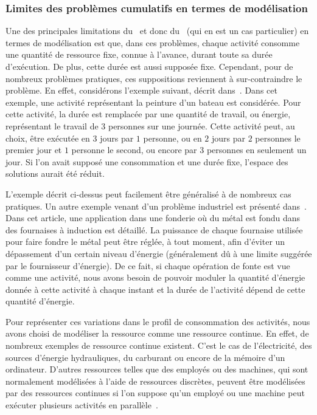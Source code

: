 \subsubsection{Limites des problèmes cumulatifs en termes de modélisation}
\label{sec:limit_CUSP}
Une des principales limitations du \RCPSP~et donc du \CUSP~(qui en est
un cas particulier) en termes de modélisation est que, dans ces
problèmes, chaque activité consomme une quantité de ressource fixe,
connue à l'avance, durant toute sa durée d'exécution. De plus, cette
durée est aussi supposée fixe. Cependant, pour de nombreux problèmes
pratiques, ces suppositions reviennent à sur-contraindre le
problème. En effet, considérons l'exemple suivant, décrit
dans~\cite{FT}.  Dans cet exemple, une activité représentant la
peinture d'un bateau est considérée. Pour cette activité, la durée est
remplacée par une quantité de travail, ou énergie, représentant le
travail de $3$ personnes sur une journée. Cette activité peut, au
choix, être exécutée en $3$ jours par $1$ personne, ou en $2$ jours
par $2$ personnes le premier jour et $1$ personne le second, ou encore
par $3$ personnes en seulement un jour. Si l'on avait supposé une
consommation et une durée fixe, l'espace des solutions aurait été
réduit.

L'exemple décrit ci-dessus peut facilement être généralisé à de
nombreux cas pratiques. Un autre exemple venant d'un problème
industriel est présenté dans~\cite{HaitArtiguesLopez}. Dans cet
article, une application dans une fonderie où du métal est fondu dans
des fournaises à induction est détaillé. La puissance de chaque
fournaise utilisée pour faire fondre le métal peut être réglée, à tout
moment, afin d'éviter un dépassement d'un certain niveau d'énergie
(généralement dû à une limite suggérée par le fournisseur
d'énergie). De ce fait, si chaque opération de fonte est vue comme une
activité, nous avons besoin de pouvoir moduler la quantité d'énergie
donnée à cette activité à chaque instant et la durée de l'activité
dépend de cette quantité d'énergie.

Pour représenter ces variations dans le profil de consommation des
activités, nous avons choisi de modéliser la ressource comme une
ressource continue. En effet, de nombreux exemples de ressource
continue existent. C'est le cas de l'électricité, des sources
d'énergie hydrauliques, du carburant ou encore de la mémoire d'un
ordinateur. D'autres ressources telles que des employés ou des
machines, qui sont normalement modélisées à l'aide de ressources
discrètes, peuvent être modélisées par des ressources continues si
l'on suppose qu'un employé ou une machine peut exécuter plusieurs
activités en parallèle~\cite{W80,NK}.

